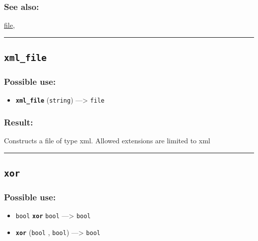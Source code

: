 \documentclass[]{book}
\providecommand{\tightlist}{%
  \setlength{\itemsep}{0pt}\setlength{\parskip}{0pt}}
\theoremstyle{definition}
\theoremstyle{definition}
\theoremstyle{definition}
\theoremstyle{remark}
\begin{document}
\subsubsection{See also:}\label{see-also-225}

\href{operators-d-to-h.html\#file}{file},

\begin{center}\rule{0.5\linewidth}{\linethickness}\end{center}

\subsection{\texorpdfstring{\texttt{xml\_file}}{xml\_file}}\label{xml_file}

\subsubsection{Possible use:}\label{possible-use-565}

\begin{itemize}
\tightlist
\item
  \textbf{\texttt{xml\_file}} (\texttt{string}) ---\textgreater{}
  \texttt{file}
\end{itemize}

\subsubsection{Result:}\label{result-544}

Constructs a file of type xml. Allowed extensions are limited to xml

\begin{center}\rule{0.5\linewidth}{\linethickness}\end{center}

\subsection{\texorpdfstring{\texttt{xor}}{xor}}\label{xor}

\subsubsection{Possible use:}\label{possible-use-566}

\begin{itemize}
\tightlist
\item
  \texttt{bool} \textbf{\texttt{xor}} \texttt{bool} ---\textgreater{}
  \texttt{bool}
\item
  \textbf{\texttt{xor}} (\texttt{bool} , \texttt{bool})
  ---\textgreater{} \texttt{bool}
\end{itemize}
\end{document}
